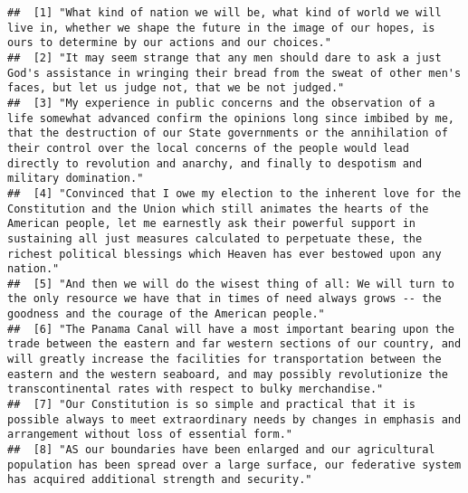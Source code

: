 \documentclass[]{article}
\begin{document}
\begin{verbatim}
##  [1] "What kind of nation we will be, what kind of world we will live in, whether we shape the future in the image of our hopes, is ours to determine by our actions and our choices."                                                                                                                                                                          
##  [2] "It may seem strange that any men should dare to ask a just God's assistance in wringing their bread from the sweat of other men's faces, but let us judge not, that we be not judged."                                                                                                                                                                    
##  [3] "My experience in public concerns and the observation of a life somewhat advanced confirm the opinions long since imbibed by me, that the destruction of our State governments or the annihilation of their control over the local concerns of the people would lead directly to revolution and anarchy, and finally to despotism and military domination."
##  [4] "Convinced that I owe my election to the inherent love for the Constitution and the Union which still animates the hearts of the American people, let me earnestly ask their powerful support in sustaining all just measures calculated to perpetuate these, the richest political blessings which Heaven has ever bestowed upon any nation."             
##  [5] "And then we will do the wisest thing of all: We will turn to the only resource we have that in times of need always grows -- the goodness and the courage of the American people."                                                                                                                                                                        
##  [6] "The Panama Canal will have a most important bearing upon the trade between the eastern and far western sections of our country, and will greatly increase the facilities for transportation between the eastern and the western seaboard, and may possibly revolutionize the transcontinental rates with respect to bulky merchandise."                   
##  [7] "Our Constitution is so simple and practical that it is possible always to meet extraordinary needs by changes in emphasis and arrangement without loss of essential form."                                                                                                                                                                                
##  [8] "AS our boundaries have been enlarged and our agricultural population has been spread over a large surface, our federative system has acquired additional strength and security."                                                                                                                                                                          

\end{verbatim}
\end{document}
